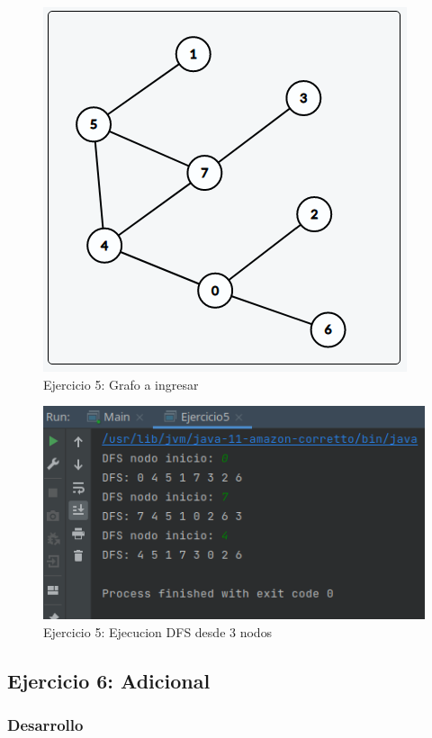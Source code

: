 \documentclass{article}
\begin{document}
				\begin{figure}[H]
					\centering
					\includegraphics[scale= 0.6]{images/e5graph.png}
					\caption*{Ejercicio 5: Grafo a ingresar}
				\end{figure}
				
				\begin{figure}[H]
					\centering
					\includegraphics[scale= 0.7]{images/e51.png}
					\caption*{Ejercicio 5: Ejecucion DFS desde 3 nodos}
				\end{figure}
			
		\subsection{Ejercicio 6: Adicional}
		
			\subsubsection{Desarrollo}
				
\end{document}
